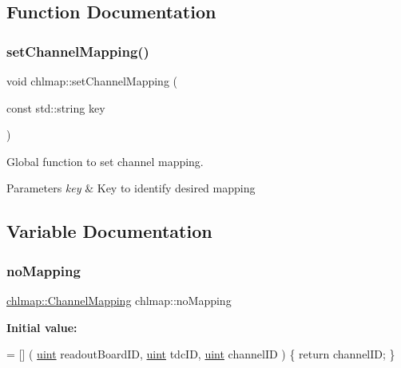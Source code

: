 \subsection{Function Documentation}
\mbox{\label{namespacechlmap_a945bd413e64427712373da77277dd443}} 
\subsubsection{\texorpdfstring{set\+Channel\+Mapping()}{setChannelMapping()}}
{\footnotesize\ttfamily void chlmap\+::set\+Channel\+Mapping (\begin{DoxyParamCaption}\item[{const std\+::string}]{key }\end{DoxyParamCaption})}



Global function to set channel mapping. 


\begin{DoxyParams}{Parameters}
{\em key} & Key to identify desired mapping \\
\hline
\end{DoxyParams}


\subsection{Variable Documentation}
\mbox{\label{namespacechlmap_adeefba45d9765c580e5f7ef9cb99acc5}} 
\subsubsection{\texorpdfstring{no\+Mapping}{noMapping}}
{\footnotesize\ttfamily \hyperlink{namespacechlmap_aeed247fbd4770834005177ddb2712668}{chlmap\+::\+Channel\+Mapping} chlmap\+::no\+Mapping}

{\bfseries Initial value\+:}
\begin{DoxyCode}
= [] (
    \hyperlink{_channel_mappings_8cpp_a69aa29b598b851b0640aa225a9e5d61d}{uint} readoutBoardID,
    \hyperlink{_channel_mappings_8cpp_a69aa29b598b851b0640aa225a9e5d61d}{uint} tdcID,
    \hyperlink{_channel_mappings_8cpp_a69aa29b598b851b0640aa225a9e5d61d}{uint} channelID
) \{
    \textcolor{keywordflow}{return} channelID;
\}
\end{DoxyCode}


